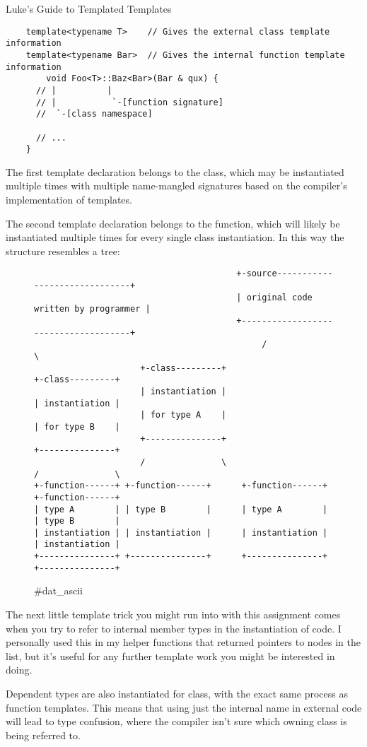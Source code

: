 \begin{section}{Luke's Guide to Templated Templates}
 \begin{verbatim}
    template<typename T>    // Gives the external class template information
    template<typename Bar>  // Gives the internal function template information
		void Foo<T>::Baz<Bar>(Bar & qux) {
      // |          |
      // |           `-[function signature]
      //  `-[class namespace]

      // ...
    }
 \end{verbatim}


 \indent The first template declaration belongs to the class, which may be instantiated
 multiple times with multiple name-mangled signatures based on the compiler's
 implementation of templates.

 \indent The second template declaration belongs to the function, which will likely be
 instantiated multiple times for every single class instantiation. In this way
 the structure resembles a tree:


 \begin{figure}[h]
	 \centering
	 \begin{verbatim}
										+-source------------------------------+
										| original code written by programmer |
										+-------------------------------------+
											 /                               \
					 +-class---------+                     +-class---------+
					 | instantiation |                     | instantiation |
					 | for type A    |                     | for type B    |
					 +---------------+                     +---------------+
					 /               \                     /               \
+-function------+ +-function------+      +-function------+ +-function------+
| type A        | | type B        |      | type A        | | type B        |
| instantiation | | instantiation |      | instantiation | | instantiation |
+---------------+ +---------------+      +---------------+ +---------------+
	\end{verbatim}
	 \caption{\#dat\_ascii}
 \end{figure}



 \pagebreak
 \indent The next little template trick you might run into with this assignment comes
 when you try to refer to internal member types in the instantiation of code.
 I personally used this in my helper functions that returned pointers to nodes
 in the list, but it's useful for any further template work you might be
 interested in doing.

 \indent Dependent types are also instantiated for  class, with the exact same
 process as function templates. This means that using just the internal name
 in external code will lead to type confusion, where the compiler isn't sure
 which owning class is being referred to.


\end{section}
